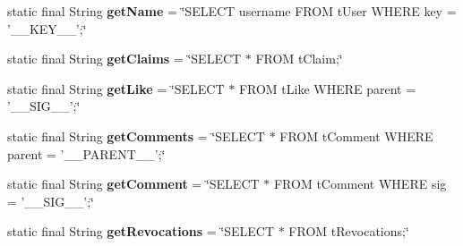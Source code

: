 \begin{DoxyCompactItemize}
\item 
\hypertarget{classballmerpeak_1_1turtlenet_1_1server_1_1DBStrings_a1a166aed33e92e5a9990201b6d426e07}{static final String {\bfseries get\-Name} = \char`\"{}S\-E\-L\-E\-C\-T username F\-R\-O\-M t\-User W\-H\-E\-R\-E key = '\-\_\-\-\_\-\-K\-E\-Y\-\_\-\-\_\-';\char`\"{}}\label{classballmerpeak_1_1turtlenet_1_1server_1_1DBStrings_a1a166aed33e92e5a9990201b6d426e07}

\item 
\hypertarget{classballmerpeak_1_1turtlenet_1_1server_1_1DBStrings_a18809032ae6a521a9293b4f4e8cfa5f4}{static final String {\bfseries get\-Claims} = \char`\"{}S\-E\-L\-E\-C\-T $\ast$ F\-R\-O\-M t\-Claim;\char`\"{}}\label{classballmerpeak_1_1turtlenet_1_1server_1_1DBStrings_a18809032ae6a521a9293b4f4e8cfa5f4}

\item 
\hypertarget{classballmerpeak_1_1turtlenet_1_1server_1_1DBStrings_ae351265e633b120e4897cf92f17d3018}{static final String {\bfseries get\-Like} = \char`\"{}S\-E\-L\-E\-C\-T $\ast$ F\-R\-O\-M t\-Like W\-H\-E\-R\-E parent = '\-\_\-\-\_\-\-S\-I\-G\-\_\-\-\_\-';\char`\"{}}\label{classballmerpeak_1_1turtlenet_1_1server_1_1DBStrings_ae351265e633b120e4897cf92f17d3018}

\item 
\hypertarget{classballmerpeak_1_1turtlenet_1_1server_1_1DBStrings_a1576b88412e7eac8188422b2f9945cd4}{static final String {\bfseries get\-Comments} = \char`\"{}S\-E\-L\-E\-C\-T $\ast$ F\-R\-O\-M t\-Comment W\-H\-E\-R\-E parent = '\-\_\-\-\_\-\-P\-A\-R\-E\-N\-T\-\_\-\-\_\-';\char`\"{}}\label{classballmerpeak_1_1turtlenet_1_1server_1_1DBStrings_a1576b88412e7eac8188422b2f9945cd4}

\item 
\hypertarget{classballmerpeak_1_1turtlenet_1_1server_1_1DBStrings_a5584702225a961d74dc35ee4660c136e}{static final String {\bfseries get\-Comment} = \char`\"{}S\-E\-L\-E\-C\-T $\ast$ F\-R\-O\-M t\-Comment W\-H\-E\-R\-E sig = '\-\_\-\-\_\-\-S\-I\-G\-\_\-\-\_\-';\char`\"{}}\label{classballmerpeak_1_1turtlenet_1_1server_1_1DBStrings_a5584702225a961d74dc35ee4660c136e}

\item 
\hypertarget{classballmerpeak_1_1turtlenet_1_1server_1_1DBStrings_a8dc5636da5576be650e1de5c08109bc8}{static final String {\bfseries get\-Revocations} = \char`\"{}S\-E\-L\-E\-C\-T $\ast$ F\-R\-O\-M t\-Revocations;\char`\"{}}\label{classballmerpeak_1_1turtlenet_1_1server_1_1DBStrings_a8dc5636da5576be650e1de5c08109bc8}


\end{DoxyCompactItemize}

